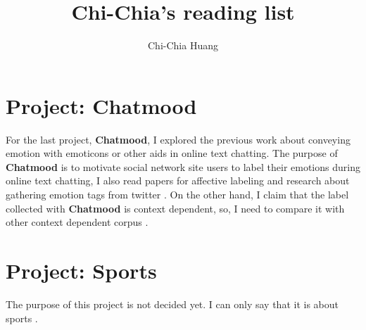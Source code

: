 \documentclass[a4paper]{article}
\title{\textbf{Chi-Chia's reading list}}
\author{Chi-Chia Huang}
\begin{document}
\maketitle

\section{Project: Chatmood}
For the last project, \textbf{Chatmood}, I explored the previous work about conveying emotion with emoticons\cite{Sanchez:CLIHC05,Sanchez:IHC06} or other aids\cite{Yeo:CHIEA08, Tsetserukou:LNCS09} in online text chatting. The purpose of \textbf{Chatmood} is to motivate social network site users to label their emotions during online text chatting, I also read papers for affective labeling \cite{Broekens:ACII09} and research about gathering emotion tags from twitter \cite{Pak:LREC10, Wu:AAAI15}. On the other hand, I claim that the label collected with \textbf{Chatmood} is context dependent, so, I need to compare it with other context dependent corpus \cite{Boia:AAAI14}.

\section{Project: Sports}
The purpose of this project is not  decided yet. I can only say that it is about sports \cite{Jensen:CHI15, Knaving:CHI15, Kosmalla:CHI15, Mueller:CHI15}.

 

\end{document}
